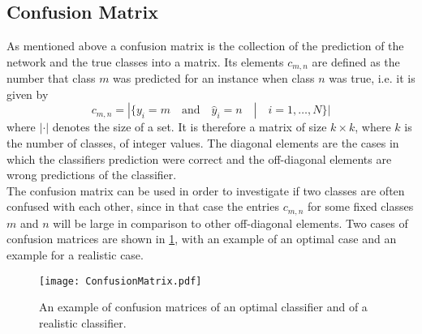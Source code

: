 \subsection{Confusion Matrix}

As mentioned above a confusion matrix is the collection of the prediction of the network and the true classes into a matrix. Its elements $c_{m,n}$ are defined as the number that class $m$ was predicted for an instance when class $n$ was true, i.e. it is given by
\begin{equation}
c_{m,n} = | \{y_i = m \quad \textrm{and} \quad \hat{y}_i = n \quad | \quad i=1,\dots,N  \} |
\end{equation}
where $|\cdot |$ denotes the size of a set. It is therefore a matrix of size $k\times k$, where $k$ is the number of classes, of integer values. The diagonal elements are the cases in which the classifiers prediction were correct and the off-diagonal elements are wrong predictions of the classifier. \\

The confusion matrix can be used in order to investigate if two classes are often confused with each other, since in that case the entries $c_{m,n}$ for some fixed classes $m$ and $n$ will be large in comparison to other off-diagonal elements. Two cases of confusion matrices are shown in \ref{fig:ConfusionMatrix}, with an example of an optimal case and an example for a realistic case. \\

\begin{figure}[H]
\centering
\texttt{[image: ConfusionMatrix.pdf]}
\caption{An example of confusion matrices of an optimal classifier and of a realistic classifier.}
\label{fig:ConfusionMatrix}
\end{figure}



